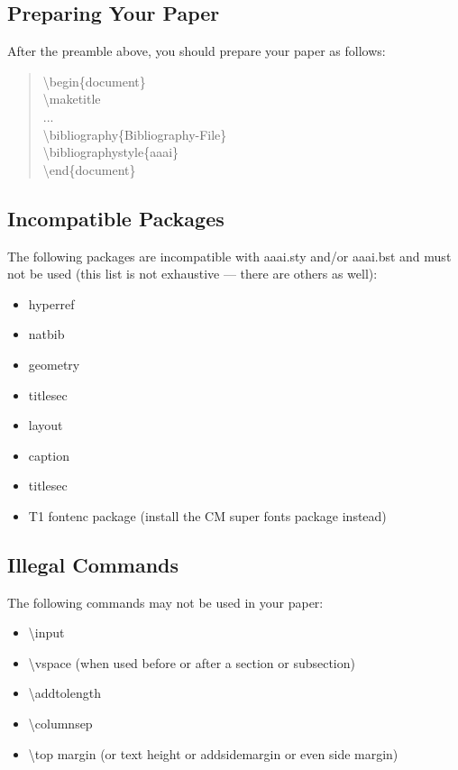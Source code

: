 \documentclass[letterpaper]{article}
\begin{document}
	
	
	\subsection{Preparing Your Paper}
	
	After the preamble above, you should prepare your paper as follows:
	
	\begin{quote}
		\begin{small}
			\textbackslash begin\{document\}\\
			\textbackslash maketitle\\
			...\\
			\textbackslash bibliography\{Bibliography-File\}\\
			\textbackslash bibliographystyle\{aaai\}\\
			\textbackslash end\{document\}\\
		\end{small}
	\end{quote}
	\subsection{Incompatible Packages}
	The following packages are incompatible with aaai.sty and/or aaai.bst and must not be used (this list is not exhaustive --- there are others as well):
	\begin{itemize}
		\item hyperref
		\item natbib
		\item geometry
		\item titlesec
		\item layout
		\item caption
		\item titlesec
		\item T1 fontenc package (install the CM super fonts package instead)
	\end{itemize}
	
	\subsection{Illegal Commands}
	The following commands may not be used in your paper:
	\begin{itemize}
		\item \textbackslash input
		\item \textbackslash vspace (when used before or after a section or subsection)
		\item \textbackslash addtolength 
		\item \textbackslash columnsep
		\item \textbackslash top margin (or text height or addsidemargin or even side margin)
	\end{itemize}
	
\end{document}
